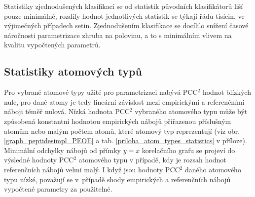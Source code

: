 Statistiky zjednodušených klasifikací se od statistik původních klasifikátorů liší pou\-ze minimálně, rozdíly hodnot jednotlivých statistik se týkají řádu tisícin, ve výjimečných případech setin. Zjednodušením klasifikace se docílilo snížení časové náročnosti parametrizace zhruba na polovinu, a to s minimálním vlivem na kvalitu vypočtených parametrů.


\subsection{Statistiky atomových typů}

Pro vybrané atomové typy užité pro parametrizaci nabývá PCC$^2$ hodnot blízkých nule, pro dané atomy je tedy lineární závislost mezi empirickými a referenčními náboji téměř nulová. Nízká hodnota PCC$^2$ vybraného atomového typu může být způsobená konstantní hodnotou empirických nábojů přiřazenou příslušným atomům nebo malým počtem atomů, které atomový typ reprezentují (viz obr. \ref{graph_peptidesimpl_PEOE} a tab. \ref{priloha_atom_types_statistics} v příloze). Minimální odchylky nábojů od přímky $y = x$ korelačního grafu se projeví do výsledné hodnoty PCC$^2$ atomového typu v případě, kdy je rozsah hodnot referenčních nábojů  velmi malý. I když jsou hodnoty PCC$^2$ daného atomového typu nízké, považují se v~případě shody empirických a referenčních nábojů vypočtené parametry za použitelné.


